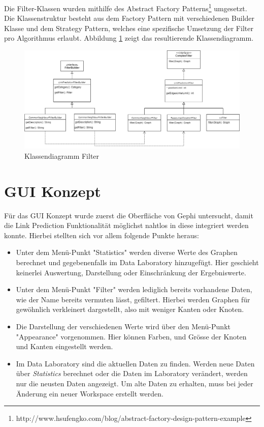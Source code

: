 Die Filter-Klassen wurden mithilfe des Abstract Factory Patterns\footnote{http://www.hsufengko.com/blog/abstract-factory-design-pattern-example} umgesetzt. Die Klassenstruktur besteht aus dem Factory Pattern mit verschiedenen Builder Klasse und dem Strategy Pattern, welches eine spezifische Umsetzung der Filter pro Algorithmus erlaubt. Abbildung \ref{fig:class_filter} zeigt das resultierende Klassendiagramm.
\begin{figure}[h]
    \centering
    \includegraphics[width=\linewidth]{resources/class_Filter.png}
    \caption{Klassendiagramm Filter}
    \label{fig:class_filter}
\end{figure}


\section{GUI Konzept}

Für das GUI Konzept wurde zuerst die Oberfläche von Gephi untersucht, damit die Link Prediction Funktionalität möglichst
nahtlos in diese integriert werden konnte. Hierbei stellten sich vor allem folgende Punkte heraus:

\begin{itemize}
    \item Unter dem Menü-Punkt "Statistics" werden diverse Werte des Graphen berechnet und gegebenenfalls im Data Laboratory
          hinzugefügt. Hier geschieht keinerlei Auswertung, Darstellung oder Einschränkung der Ergebniswerte.
    \item Unter dem Menü-Punkt "Filter" werden lediglich bereits vorhandene Daten, wie der Name bereits vermuten lässt,
          gefiltert. Hierbei werden Graphen für gewöhnlich verkleinert dargestellt, also mit weniger Kanten oder Knoten.
    \item Die Darstellung der verschiedenen Werte wird über den Menü-Punkt "Appearance" vorgenommen. Hier können Farben,
          und Grösse der Knoten und Kanten eingestellt werden.
    \item Im Data Laboratory sind die aktuellen Daten zu finden. Werden neue Daten über \textit{Statistics} berechnet
          oder die Daten im Laboratory verändert, werden nur die neusten Daten angezeigt. Um alte Daten zu erhalten,
          muss bei jeder Änderung ein neuer Workspace erstellt werden.
\end{itemize}

